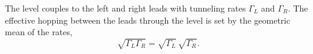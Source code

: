 \documentclass{article}
\begin{document}
The level couples to the left and right leads with tunneling rates $\Gamma_L$ and $\Gamma_R$. The
effective hopping between the leads through the level is set by the geometric mean of the rates,
\begin{equation}
\sqrt{\Gamma_L\Gamma_R} = \sqrt{\Gamma_L}\,\sqrt{\Gamma_R} .
\label{eq:geo}
\end{equation}
\end{document}
